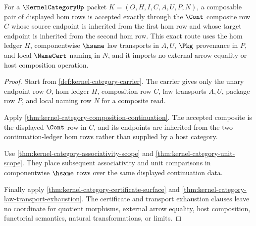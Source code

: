 \begin{theorem}
\label{thm:kernel-category-composition-cont-route-exactness}
For a $\KernelCategoryUp$ packet $K=(O,H,I,C,A,U,P,N)$, a composable pair of displayed hom rows is accepted exactly through the $\Cont$ composite row $C$ whose source endpoint is inherited from the first hom row and whose target endpoint is inherited from the second hom row. This exact route uses the hom ledger $H$, componentwise $\hsame$ law transports in $A,U$, $\Pkg$ provenance in $P$, and local $\NameCert$ naming in $N$, and it imports no external arrow equality or host composition operation.
\end{theorem}
\begin{proof}
Start from \autoref{def:kernel-category-carrier}. The carrier gives only the unary endpoint row $O$, hom ledger $H$, composition row $C$, law transports $A,U$, package row $P$, and local naming row $N$ for a composite read.

Apply \autoref{thm:kernel-category-composition-continuation}. The accepted composite is the displayed $\Cont$ row in $C$, and its endpoints are inherited from the two continuation-ledger hom rows rather than supplied by a host category.

Use \autoref{thm:kernel-category-associativity-scope} and \autoref{thm:kernel-category-unit-scope}. They place subsequent associativity and unit comparisons in componentwise $\hsame$ rows over the same displayed continuation data.

Finally apply \autoref{thm:kernel-category-certificate-surface} and \autoref{thm:kernel-category-law-transport-exhaustion}. The certificate and transport exhaustion clauses leave no coordinate for quotient morphisms, external arrow equality, host composition, functorial semantics, natural transformations, or limits.
\end{proof}

